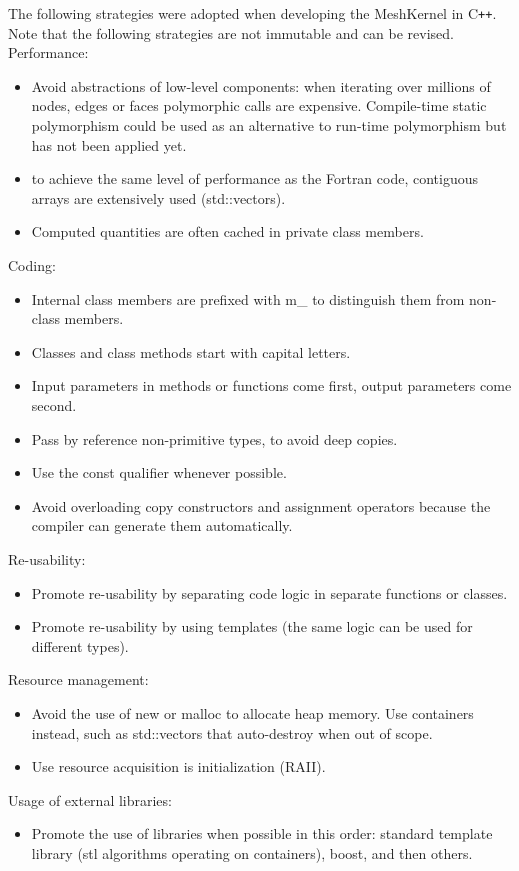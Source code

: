 \documentclass[biblatex]{deltares_manual}
\newcommand{\cpp}{\mbox{C\texttt{++}}\xspace}
\begin{document}
The following strategies were adopted when developing the MeshKernel in \cpp.
Note that the following strategies are not immutable and can be revised.
Performance:
\begin{itemize}
\item Avoid abstractions of low-level components: when iterating over millions of nodes, edges or faces polymorphic calls are expensive. Compile-time static polymorphism could be used as an alternative to run-time polymorphism but has not been applied yet.
\item to achieve the same level of performance as the Fortran code, contiguous arrays are extensively used (std::vectors).
\item Computed quantities are often cached in private class members.
\end{itemize}
Coding:
\begin{itemize}
\item Internal class members are prefixed with m\_ to distinguish them from non-class members.
\item Classes and class methods start with capital letters.
\item Input parameters in methods or functions come first, output parameters come second.
\item Pass by reference non-primitive types, to avoid deep copies.
\item Use the const qualifier whenever possible.
\item Avoid overloading copy constructors and assignment operators because the compiler can generate them automatically.
\end{itemize}
Re-usability:
\begin{itemize}
\item Promote re-usability by separating code logic in separate functions or classes.
\item Promote re-usability by using templates (the same logic can be used for different types).
\end{itemize}
Resource management:
\begin{itemize}
\item Avoid the use of new or malloc to allocate heap memory. Use containers instead, such as std::vectors that auto-destroy when out of scope.
\item Use resource acquisition is initialization (RAII).
\end{itemize}
Usage of external libraries:
\begin{itemize}
\item Promote the use of libraries when possible in this order: standard template library (stl algorithms operating on containers), boost, and then others.
\end{itemize}
\end{document}

